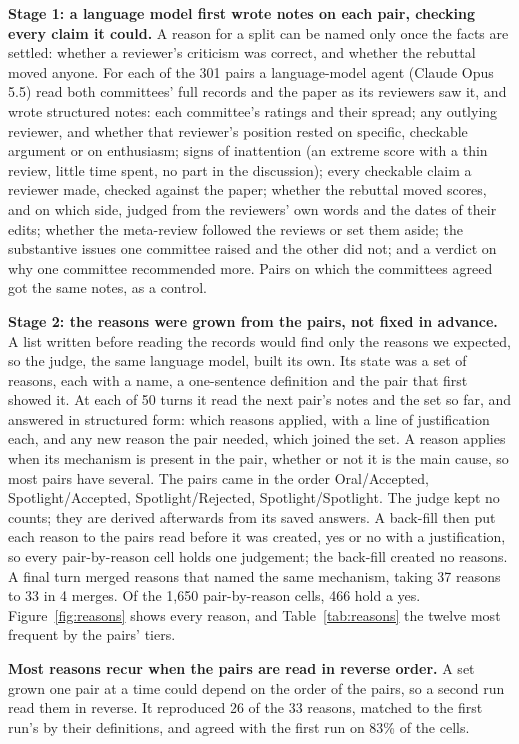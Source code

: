 \documentclass{article}
\begin{document}
\textbf{Stage 1: a language model first wrote notes on each pair, checking every claim it could.} A reason for a split can be named only once the facts are settled: whether a reviewer's criticism was correct, and whether the rebuttal moved anyone. For each of the 301 pairs a language-model agent (Claude Opus 5.5) read both committees' full records and the paper as its reviewers saw it, and wrote structured notes: each committee's ratings and their spread; any outlying reviewer, and whether that reviewer's position rested on specific, checkable argument or on enthusiasm; signs of inattention (an extreme score with a thin review, little time spent, no part in the discussion); every checkable claim a reviewer made, checked against the paper; whether the rebuttal moved scores, and on which side, judged from the reviewers' own words and the dates of their edits; whether the meta-review followed the reviews or set them aside; the substantive issues one committee raised and the other did not; and a verdict on why one committee recommended more. Pairs on which the committees agreed got the same notes, as a control.

\textbf{Stage 2: the reasons were grown from the pairs, not fixed in advance.} A list written before reading the records would find only the reasons we expected, so the judge, the same language model, built its own. Its state was a set of reasons, each with a name, a one-sentence definition and the pair that first showed it. At each of 50 turns it read the next pair's notes and the set so far, and answered in structured form: which reasons applied, with a line of justification each, and any new reason the pair needed, which joined the set. A reason applies when its mechanism is present in the pair, whether or not it is the main cause, so most pairs have several. The pairs came in the order Oral/Accepted, Spotlight/Accepted, Spotlight/Rejected, Spotlight/Spotlight. The judge kept no counts; they are derived afterwards from its saved answers. A back-fill then put each reason to the pairs read before it was created, yes or no with a justification, so every pair-by-reason cell holds one judgement; the back-fill created no reasons. A final turn merged reasons that named the same mechanism, taking 37 reasons to 33 in 4 merges. Of the 1,650 pair-by-reason cells, 466 hold a yes. Figure~\ref{fig:reasons} shows every reason, and Table~\ref{tab:reasons} the twelve most frequent by the pairs' tiers.

\textbf{Most reasons recur when the pairs are read in reverse order.} A set grown one pair at a time could depend on the order of the pairs, so a second run read them in reverse. It reproduced 26 of the 33 reasons, matched to the first run's by their definitions, and agreed with the first run on 83\% of the cells.
\end{document}
